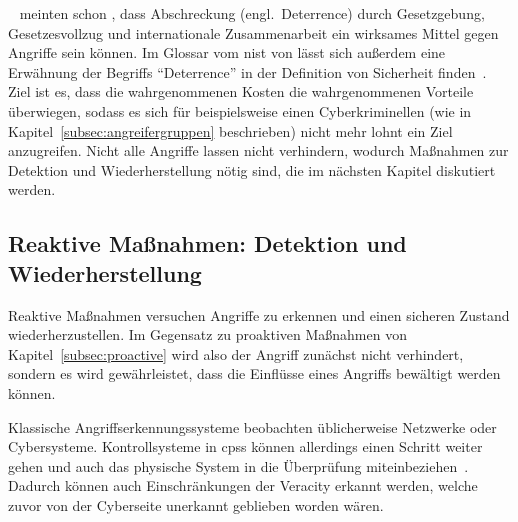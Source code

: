 \documentclass[final,bibliography=totocnumbered]{include/sikseminar}
\newcommand{\cps}{\glspl{cps}\xspace}
\begin{document}
\citeauthor{CAS+09}~\cite{CAS+09} meinten schon \citeyear{CAS+09}, dass Abschreckung (engl.\ Deterrence) durch Gesetzgebung, Gesetzesvollzug und internationale Zusammenarbeit ein wirksames Mittel gegen Angriffe sein können.
Im Glossar vom \gls{nist} von \citeyear{Kissel13} lässt sich außerdem eine Erwähnung der Begriffs \enquote{Deterrence} in der Definition von Sicherheit finden~\cite{Kissel13}.
Ziel ist es, dass die wahrgenommenen Kosten die wahrgenommenen Vorteile überwiegen, sodass es sich für beispielsweise einen Cyberkriminellen (wie in Kapitel~\ref{subsec:angreifergruppen} beschrieben) nicht mehr lohnt ein Ziel anzugreifen.
Nicht alle Angriffe lassen nicht verhindern, wodurch Maßnahmen zur Detektion und Wiederherstellung nötig sind, die im nächsten Kapitel diskutiert werden.


\subsection{Reaktive Maßnahmen: Detektion und Wiederherstellung}\label{subsec:reactive}

Reaktive Maßnahmen versuchen Angriffe zu erkennen und einen sicheren Zustand wiederherzustellen.
Im Gegensatz zu proaktiven Maßnahmen von Kapitel~\ref{subsec:proactive} wird also der Angriff zunächst nicht verhindert, sondern es wird gewährleistet, dass die Einflüsse eines Angriffs bewältigt werden können.

Klassische Angriffserkennungssysteme beobachten üblicherweise Netzwerke oder Cybersysteme.
Kontrollsysteme in \cps können allerdings einen Schritt weiter gehen und auch das physische System in die Überprüfung miteinbeziehen~\cite{CAS+09}.
Dadurch können auch Einschränkungen der Veracity erkannt werden, welche zuvor von der Cyberseite unerkannt geblieben worden wären.
\end{document}
